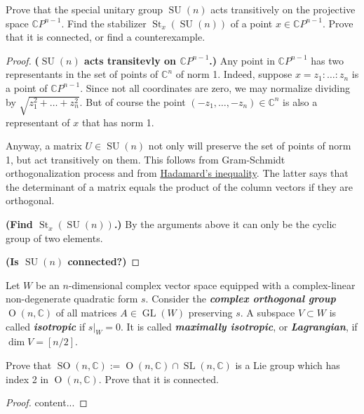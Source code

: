 \documentclass{article}
\numberwithin{equation}{section}
\newcommand{\C}{\mathbb{C}}
\renewcommand{\O}{\operatorname{O}}
\DeclareMathOperator{\GL}{GL}
\DeclareMathOperator{\SL}{SL}
\DeclareMathOperator{\SO}{SO}
\DeclareMathOperator{\SU}{SU}
\DeclareMathOperator{\St}{St}
\begin{document}
\begin{exercise}
	Prove that the special unitary group $\SU(n)$ acts transitively on the projective space $\C P^{n-1}$. Find the stabilizer $\St_x(\SU(n))$ of a point $x \in \C P^{n-1}$. Prove that it is connected, or find a counterexample.
\end{exercise}
\begin{proof}\leavevmode

	\textbf{($\SU(n)$ acts transitevly on $\C P^{n-1}$.)} Any point in $\C P^{n-1}$ has two representants in the set of points of $\C^n$ of norm 1. Indeed, suppose $x=z_1:\ldots:z_n$ is a point of $\C P^{n-1}$. Since not all coordinates are zero, we may normalize dividing by $\sqrt{z^2_1+\ldots+z^2_n}$. But of course the point $(-z_1,\ldots,-z_n)\in\C^n$ is also a representant of $x$ that has norm 1.
	
	Anyway, a matrix $U\in\SU(n)$ not only will preserve the set of points of norm 1, but act transitively on them. This follows from Gram-Schmidt orthogonalization process and from \href{https://en.wikipedia.org/wiki/Hadamard%27s_inequality}{Hadamard's inequality}. The latter says that the determinant of a matrix equals the product of the column vectors if they are orthogonal.
	
	\textbf{(Find $\St_x(\SU(n))$.)} By the arguments above it can only be the cyclic group of two elements.
	
	\textbf{(Is $\SU(n)$ connected?)}
\end{proof}

\begin{defn}
	Let $W$ be an $n$-dimensional complex vector space equipped with a complex-linear non-degenerate quadratic form $s$. Consider the \textbf{\textit{complex orthogonal group}} $\O(n,\C)$ of all matrices $A \in \GL(W )$ preserving $s$. A subspace $V \subset W$ is called \textbf{\textit{isotropic}} if $s|_W = 0$. It is called \textbf{\textit{maximally isotropic}}, or \textbf{\textit{Lagrangian}}, if $\dim V = [n/2]$.
\end{defn}

\begin{exercise}
	Prove that $\SO(n, \C) := \O(n, \C) \cap \SL(n, \C)$ is a Lie group
	which has index 2 in $\O(n, \C)$. Prove that it is connected.
\end{exercise}
\begin{proof}
	content...
\end{proof}
\end{document}
